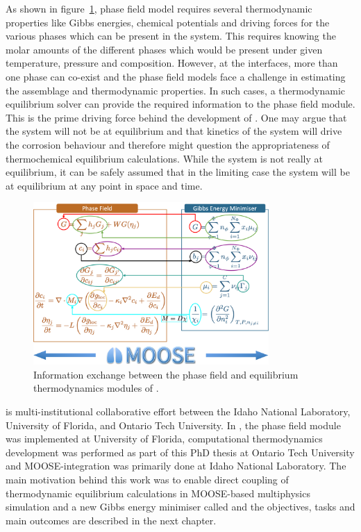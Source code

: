	As shown in figure~\ref{fig:yj_io}, {\YJ} phase field model requires several thermodynamic properties like Gibbs energies, chemical potentials and driving forces for the various phases which can be present in the system. This requires knowing the molar amounts of the different phases which would be present under given temperature, pressure and composition. However, at the interfaces, more than one phase can co-exist and the phase field models face a challenge in estimating the assemblage and thermodynamic properties. In such cases, a thermodynamic equilibrium solver can provide the required information to the phase field module. This is the prime driving force behind the development of {\GEM}. One may argue that the system will not be at equilibrium and that kinetics of the system will drive the corrosion behaviour and therefore might question the appropriateness of thermochemical equilibrium calculations. While the system is not really at equilibrium, it can be safely assumed that in the limiting case the system will be at equilibrium at any point in space and time.
	\begin{figure}[htb]
		\centering
		\includegraphics[width=0.8\textwidth]{figures/chapter-1/YJ_PF_IO.png}
		\caption{Information exchange between the phase field and equilibrium thermodynamics modules of \YJ.}
		\label{fig:yj_io}
	\end{figure} 	

	{\YJ} is multi-institutional collaborative effort between the Idaho National Laboratory, University of Florida, and Ontario Tech University.  In {\YJ}, the phase field module was implemented at University of Florida, computational thermodynamics development was performed as part of this PhD thesis at Ontario Tech University and MOOSE-integration was primarily done at Idaho National Laboratory. The main motivation behind this work was to enable direct coupling of thermodynamic equilibrium calculations in MOOSE-based multiphysics simulation and a new Gibbs energy minimiser called {\GEM} and the objectives, tasks and main outcomes are described in the next chapter.
	
